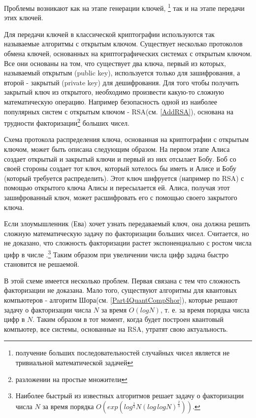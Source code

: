 Проблемы возникают как на этапе генерации ключей, \footnote{получение больших
последовательностей случайных чисел является не тривиальной
математической задачей} так и на этапе передачи этих ключей. 

Для передачи ключей в классической криптографии используются так
называемые алгоритмы с открытым ключом. Существует несколько
протоколов обмена ключей, основанных на криптографических системах с
открытым ключом. Все они основаны на том, что существует два ключа,
первый из которых, называемый открытым (public key), используется только
для зашифрования, а второй - закрытый (private key) для дешифрования. 
Для того чтобы получить закрытый ключ из открытого,
необходимо произвести какую-то сложную математическую
операцию. Например безопасность одной из наиболее популярных систем с
открытым ключом - RSA(см. \ref {AddRSA}),
основана на трудности
факторизации\footnote{разложении на простые множители} больших чисел.

Схема протокола распределения ключа, основанная на криптографии с
открытым ключом, может быть описана следующим образом. На первом этапе
Алиса создает открытый и закрытый ключи и первый из них отсылает Бобу. 
Боб со своей стороны создает тот ключ, который хотелось бы иметь и
Алисе и Бобу (который требуется распределить). Этот ключ шифруется
(например по RSA) с помощью открытого ключа Алисы и пересылается
ей. Алиса, получая этот зашифрованный ключ, может расшифровать его с
помощью своего закрытого ключа.

Если злоумышленник (Ева) хочет узнать передаваемый ключ, она должна
решить сложную математическую задачу по факторизации больших
чисел. Считается, но не доказано, что сложность факторизации растет
экспоненциально с ростом числа цифр в числе
\cite{bPhisQuantInfo}.\footnote{Наиболее быстрый из известных
  алгоритмов решает задачу о факторизации числа $N$ за время порядка
  $O\left(exp\left(log^{\frac{1}{3}}N\left(log \, log N\right)^{\frac{2}{3}}\right)\right)$.} 
Таким образом при увеличении числа цифр задача быстро становится не решаемой.

В этой схеме имеется несколько проблем. Первая связана с тем что
сложность факторизации не доказана. Мало того, существуют алгоритмы для
квантовых компьютеров - алгоритм Шора(см. \ref {Part4QuantCompShor}),
которые решают задачу о факторизации числа $N$ за время $O\left(log
N\right)$, т. е. за время порядка числа цифр в $N$. Таким образом в
тот момент, когда будет построен квантовый компьютер, все системы,
основанные на RSA, утратят свою актуальность. 

